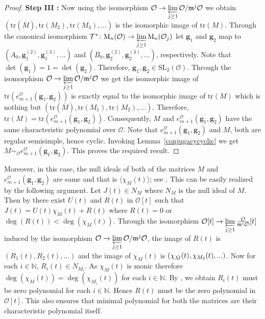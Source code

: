 \documentclass[10pt,twoside]{amsart}
\newcommand{\SL}{\mathrm{SL}}
\newcommand{\tr}{\mathrm{tr}}
\newcommand{\M}{\mathrm{M}}
\theoremstyle{definition}
\theoremstyle{definition}
\begin{document}
\begin{proof}
\textbf{Step III :} Now using the isomorphism $\mathcal{O} \rightarrow \varprojlim\limits_{j\geq 1} \mathcal{O}/ \mathfrak{m}^j\mathcal{O}$ we obtain $(\tr(\overline{M}), \tr(M_2), \tr(M_3),\ldots)$ is the isomorphic image of $\tr(M)$. Through the canonical isomorphism $\mathcal{T^*} \colon \M_n(\mathcal{O}) \rightarrow \varprojlim\limits _{j\geq 1}\M_n(\mathcal{O}_j)$ let $\mathbf{g}_1$ and $\mathbf{g}_2$ map to $(A_0, \mathbf{g}_1^{(2)}, \mathbf{g}_1^{(3)},\ldots)$ and $(B_0, \mathbf{g}_2^{(2)}, \mathbf{g}_2^{(3)},\ldots)$, respectively. Note that $\det(\mathbf{g}_1) = 1 =\det(\mathbf{g}_2)$. Therefore, $\mathbf{g}_1, \mathbf{g}_2 \in \SL_2(\mathcal{O})$. Through the isomorphism $\mathcal{O} \rightarrow \varprojlim\limits_{j\geq 1} \mathcal{O}/ \mathfrak{m}^j\mathcal{O}$ we get the isomorphic image of  $\tr(e_{m+1}^{\mathcal{O}}(\mathbf{g}_1, \mathbf{g}_2))$ is exactly equal to the isomorphic image of $\tr(M)$ which is nothing but $(\tr(\overline{M}), \tr(M_1), \tr(M_2),\ldots)$. Therefore, $\tr(M) = \tr(e_{m+1}^{\mathcal{O}}(\mathbf{g}_1, \mathbf{g}_2))$. Consequently, $M$ and $e_{m+1}^{\mathcal{O}}(\mathbf{g}_1, \mathbf{g}_2)$ have the same characteristic polynomial over $\mathcal{O}$. Note that $e_{m+1}^{\mathcal{O}}(\mathbf{g}_1, \mathbf{g}_2)$ and $M$, both are regular semisimple, hence cyclic. Invoking Lemma~\ref{conjugacycyclic} we get $M\sim _{\mathcal{O}}e_{m+1}^{\mathcal{O}}(\mathbf{g}_1, \mathbf{g}_2)$. This proves the required result.
\end{proof}

\iffalse
Moreover, in this case, the null ideals of both of the matrices $M$ and $e_{m+1}^{\mathcal{O}}(\mathbf{g}_1,\mathbf{g}_2)$ are same and that is $\langle\chi_M(t)\rangle$; see \cite[corollary 2.3]{PRS2026}. This can be easily realized by the following argument.
Let $J(t)\in N_M$ where $N_M$ is the null ideal of $M$. Then by \cite[theorem 2.14]{JacobsonAlgebraBook85} there exist $U(t)$ and $R(t)$ in $\mathcal{O}[t]$ such that $J(t)=U(t)\chi_M(t)+R(t)$ where $R(t)=0$ or $\deg(R(t))< \deg(\chi_M(t))$. Through the isomorphism $\mathcal{O}[t]\rightarrow \varprojlim\limits_{j\geq 1} \frac{\mathcal{O}}{\mathfrak{m}^j\mathcal{O}}[t]$ induced by the isomorphism $\mathcal{O}\rightarrow \varprojlim\limits_{j\geq 1} \mathcal{O}/\mathfrak{m}^j\mathcal{O}$, the image of $R(t)$ is $(R_1(t),R_2(t),...)$ and the image of $\chi_M(t)$ is $(\chi_{\Bar{M}}(t),\chi_{M_2}(t),...)$. Now for each $i\in \mathbb{N}$, $R_i(t)\in N_{M_i}$. As $\chi_M(t)$ is monic therefore $\deg(\chi_M(t))=\deg(\chi_{M_i}(t))$ for each $i\in \mathbb{N}$. By \cite[corollary 2.3]{PRS2026}, we obtain $R_i(t)$ must be zero polynomial for each $i\in \mathbb{N}$. Hence $R(t)$ must be the zero polynomial in $\mathcal{O}[t]$. This also ensures that minimal polynomial for both the matrices are their characteristic polynomial itself.
\end{document}
